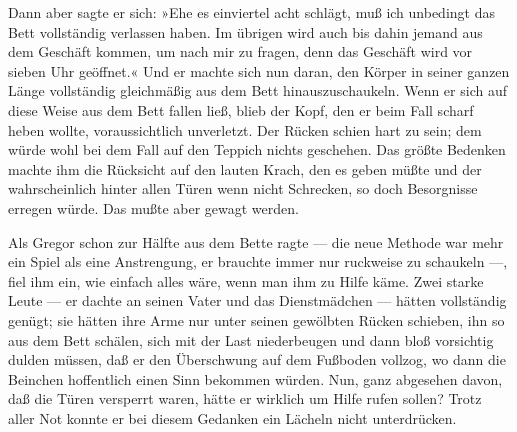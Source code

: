 Dann aber sagte er sich: »Ehe es einviertel acht schlägt, muß ich
unbedingt das Bett vollständig verlassen haben. Im übrigen wird auch bis
dahin jemand aus dem Geschäft kommen, um nach mir zu fragen, denn das
Geschäft wird vor sieben Uhr geöffnet.« Und er machte sich nun daran,
den Körper in seiner ganzen Länge vollständig gleichmäßig aus dem Bett
hinauszuschaukeln. Wenn er sich auf diese Weise aus dem Bett fallen
ließ, blieb der Kopf, den er beim Fall scharf heben wollte,
voraussichtlich unverletzt. Der Rücken schien hart zu sein; dem würde
wohl bei dem Fall auf den Teppich nichts geschehen. Das größte Bedenken
machte ihm die Rücksicht auf den lauten Krach, den es geben müßte und
der wahrscheinlich hinter allen Türen wenn nicht Schrecken, so doch
Besorgnisse erregen würde. Das mußte aber gewagt werden.

Als Gregor schon zur Hälfte aus dem Bette ragte --- die neue Methode war
mehr ein Spiel als eine Anstrengung, er brauchte immer nur ruckweise zu
schaukeln ---, fiel ihm ein, wie einfach alles wäre, wenn man ihm zu
Hilfe käme. Zwei starke Leute --- er dachte an seinen Vater und das
Dienstmädchen --- hätten vollständig genügt; sie hätten ihre Arme nur
unter seinen gewölbten Rücken schieben, ihn so aus dem Bett schälen,
sich mit der Last niederbeugen und dann bloß vorsichtig dulden müssen,
daß er den Überschwung auf dem Fußboden vollzog, wo dann die Beinchen
hoffentlich einen Sinn bekommen würden. Nun, ganz abgesehen davon, daß
die Türen versperrt waren, hätte er wirklich um Hilfe rufen sollen?
Trotz aller Not konnte er bei diesem Gedanken ein Lächeln nicht
unterdrücken.

